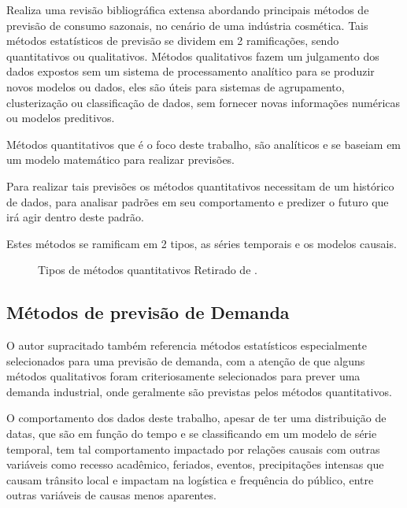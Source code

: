 \documentclass[	12pt, Times, openright, twoside, a4paper, english, brazil]{abntex2}
\begin{document}
          \cite{Junior2007} Realiza uma revisão bibliográfica extensa abordando principais métodos de previsão de consumo sazonais, no cenário de uma indústria cosmética. Tais métodos estatísticos de previsão se dividem em 2 ramificações, sendo quantitativos ou qualitativos. Métodos qualitativos fazem um julgamento dos dados expostos sem um sistema de processamento analítico para se produzir novos modelos ou dados, eles são úteis para sistemas de agrupamento, clusterização ou classificação de dados, sem fornecer novas informações numéricas ou modelos preditivos.

          Métodos quantitativos que é o foco deste trabalho, são analíticos e se baseiam em um modelo matemático para realizar previsões. 

          Para realizar tais previsões os métodos quantitativos necessitam de um histórico de dados, para analisar padrões em seu comportamento e predizer o futuro que irá agir dentro deste padrão.

          Estes métodos se ramificam em 2 tipos, as séries temporais e os modelos causais.
          \begin{figure}[!ht]
          	\caption{Tipos de métodos quantitativos Retirado de \cite{Junior2007}.\label{fig:metodosQuantitativos}}
          \end{figure}

        \subsection{Métodos de previsão de Demanda}
          O autor supracitado também referencia métodos estatísticos especialmente selecionados para uma previsão de demanda, com a atenção de que alguns métodos qualitativos foram criteriosamente selecionados para prever uma demanda industrial, onde geralmente são previstas pelos métodos quantitativos.

          O comportamento dos dados deste trabalho, apesar de ter uma distribuição de datas, que são em função do tempo e se classificando em um modelo de série temporal, tem tal comportamento impactado por relações causais com outras variáveis como recesso acadêmico, feriados, eventos, precipitações intensas que causam trânsito local e impactam na logística e frequência do público, entre outras variáveis de causas menos aparentes.
\end{document}
